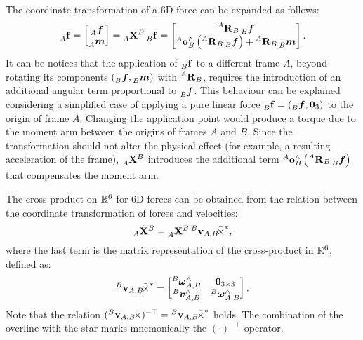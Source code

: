 \begin{remark*}
%
The coordinate transformation of a 6D force can be expanded as follows:
%
\begin{equation*}
    \forcesix[A]
    = \begin{bmatrix}
        \forcelin[A] \\ \forceang[A]
    \end{bmatrix}
    = \transfor[A]^B \forcesix[B]
    = \begin{bmatrix}
        \rot[A]_B \forcelin[B] \\
        \ori[A]_B^\wedge \left( \rot[A]_B \forcelin[B] \right) + \rot[A]_B \forceang[B]
    \end{bmatrix}
    .
\end{equation*}
%
It can be notices that the application of $\forcesix[B]$ to a different frame $A$, beyond rotating its components $(\forcelin[B], \forceang[B])$ with $\rot[A]_B$, requires the introduction of an additional angular term proportional to $\forcelin[B]$.
This behaviour can be explained considering a simplified case of applying a pure linear force $\forcesix[B] = (\forcelin[B], \zeros_3)$ to the origin of frame $A$.
Changing the application point would produce a torque due to the moment arm between the origins of frames $A$ and $B$.
Since the transformation should not alter the physical effect (for example, a resulting acceleration of the frame), $\transfor[A]^B$ introduces the additional term $\ori[A]_B^\wedge \left( \rot[A]_B \forcelin[B] \right)$ that compensates the moment arm.
%
\end{remark*}

The cross product on $\realn^6$ for 6D forces can be obtained from the relation between the coordinate transformation of forces and velocities:
%
\begin{equation*}
    {}_A \dot{\mathbf{X}}^B = \transfor[A]^B \crossforsix[{\velsix[B]_{A,B}}]
    ,
\end{equation*}
%
where the last term is the matrix representation of the cross-product in $\realn^6$, defined as:
%
\begin{equation*}
    \crossforsix[{\velsix[B]_{A,B}}] =
    \begin{bmatrix}
        \velang[B]_{A,B}^\wedge & \zeros_{3\times3} \\
        \vellin[B]_{A, B}^\wedge & \velang[B]_{A,B}^\wedge
    \end{bmatrix}
    .
\end{equation*}
%
Note that the relation $(\crossvelsix[{\velsix[B]_{A,B}}])^{-\top} = \crossforsix[{\velsix[B]_{A,B}}]$ holds.
The combination of the overline with the star marks mnemonically the $(\cdot)^{-\top}$ operator.


